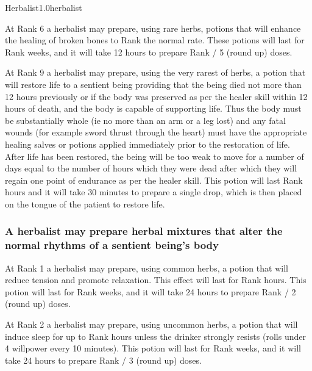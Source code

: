 \begin{skill}{Herbalist}{1.0}{herbalist}
\begin{Enumerate}
\item At Rank 6 a herbalist may prepare, using rare herbs, potions
that will enhance the healing of broken bones to Rank \x the normal
rate.  These potions will last for Rank weeks, and it will take 12
hours to prepare Rank / 5 (round up) doses.

\item At Rank 9 a herbalist may prepare, using the very rarest of
herbs, a potion that will restore life to a sentient being providing
that the being died not more than 12 hours previously or if the body
was preserved as per the healer skill within 12 hours of death, and
the body is capable of supporting life.  Thus the body must be
substantially whole (ie no more than an arm or a leg lost) and any
fatal wounds (for example sword thrust through the heart) must have
the appropriate healing salves or potions applied immediately prior to
the restoration of life.  After life has been restored, the being will
be too weak to move for a number of days equal to the number of hours
which they were dead after which they will regain one point of
endurance as per the healer skill.  This potion will last Rank 
hours and it will take 30 minutes to prepare a single drop, which is
then placed on the tongue of the patient to restore life.


\end{Enumerate}

\subsubsection{A herbalist may prepare herbal mixtures that alter the
normal rhythms of a sentient being's body}

\begin{Enumerate}

\item At Rank 1 a herbalist may prepare, using common herbs, a potion
that will reduce tension and promote relaxation.  This effect will
last for Rank  hours.  This potion will last for Rank weeks, and it
will take 24 hours to prepare Rank / 2 (round up) doses.

\item At Rank 2 a herbalist may prepare, using uncommon herbs, a
potion that will induce sleep for up to Rank  hours unless the
drinker strongly resists (rolls under 4 \x willpower every 10
minutes). This potion will last for Rank weeks, and it will take 24
hours to prepare Rank / 3 (round up) doses.


\end{Enumerate}
\end{skill}
